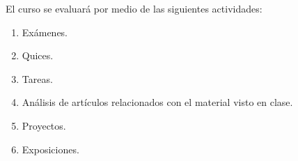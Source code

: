 \begin{refsection}
El curso se evaluará por medio de las siguientes actividades:

\begin{enumerate}
\item Exámenes.
\item Quices.
\item Tareas.
\item Análisis de artículos relacionados con el material visto en clase.
\item Proyectos.
\item Exposiciones.
\end{enumerate}

\nocite{BrSt02}
\nocite{HaKa03}
\nocite{KaHa95}
\nocite{Rob99}
\nocite{Sam05}
\nocite{SamUr}
\nocite{ViaOl16}
\nocite{Wal82}
\nocite{MeSt93}

\printcursosbibliography
\end{refsection}
